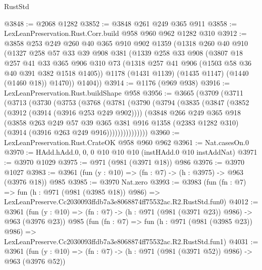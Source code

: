 \begin{lexlean}{RustStd}
\begin{coremodule}
@3848 := @2068 @1282
@3852 := @3848 @261 @249 @365 @911
@3858 := LexLeanPreservation.Rust.Corr.build @958 @960 @962 @1282 @310
@3912 := @3858
    @253
    @249
    @260
    @40
    @365
    @910
    @902
    @1359
    (@1318
      @260
      @40
      @910
      (@1327
        @258
        @57
        @33
        @39
        @908
        @381
        (@1339
          @258
          @33
          @908
          (@3807
            @18
            @257
            @41
            @33
            @365
            @906
            @310
            @73
            (@1318 @257 @41 @906 (@1503 @58 @36 @40 @391 @382 @1518 @1405))
            @1178
            (@1431 @1139)
            (@1435 @1147)
            (@1440 (@1460 @18))
            @1470))
        @1404))
@3914 := @1176 (@969 @938)
@3916 := LexLeanPreservation.Rust.buildShape @958
@3956 := @3665
    (@3709
      (@3711
        (@3713
          (@3730
            (@3753
              (@3768
                (@3781
                  (@3790
                    (@3794
                      (@3835
                        (@3847
                          (@3852 (@3912 (@3914 (@3916 @253 @249 @902))))
                          (@3848
                            @266
                            @249
                            @365
                            @918
                            (@3858
                              @263
                              @249
                              @57
                              @39
                              @365
                              @381
                              @916
                              @1358
                              (@2383 @1282 @310)
                              (@3914 (@3916 @263 @249 @916)))))))))))))))
@3960 := LexLeanPreservation.Rust.CrateOK @958 @960 @962
@3961 := Nat.casesOn.{0}
@3970 := HAdd.hAdd.{0, 0, 0} @10 @10 @10 (instHAdd.{0} @10 instAddNat)
@3971 := @3970 @1029
@3975 := @971 (@981 (@3971 @18)) @986
@3976 := @3970 @1027
@3983 := @3961 (fun (y : @10) => (fn : @7) -> (h : @3975) -> @963 (@3976 @18)) @985
@3985 := @3970 Nat.zero
@3993 := @3983
    (fun (fn : @7) =>
    fun (h : @971 (@981 (@3985 @18)) @986) =>
    LexLeanPreserve.Cc2030093ffdb7a3e8068874ff75532ac.R2.RustStd.fun0)
@4012 := @3961
    (fun (y : @10) => (fn : @7) -> (h : @971 (@981 (@3971 @23)) @986) -> @963 (@3976 @23))
    @985
    (fun (fn : @7) =>
    fun (h : @971 (@981 (@3985 @23)) @986) =>
    LexLeanPreserve.Cc2030093ffdb7a3e8068874ff75532ac.R2.RustStd.fun1)
@4031 := @3961
    (fun (y : @10) => (fn : @7) -> (h : @971 (@981 (@3971 @52)) @986) -> @963 (@3976 @52))

\end{coremodule}
\end{lexlean}
